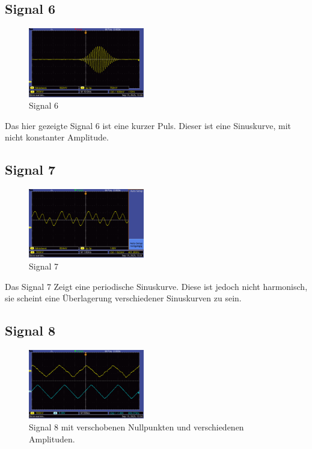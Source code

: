 \newpage
\onecolumn
\twocolumn

\subsection*{Signal 6}
\begin{figure} [h!]
    \centering
        \includegraphics[width=0.45\textwidth]{img/25/Signale2/Signal6.pdf}
    \caption{Signal 6}
\end{figure}

Das hier gezeigte Signal 6 ist eine kurzer Puls. Dieser ist eine Sinuskurve, mit nicht konstanter Amplitude.

\subsection*{Signal 7}
\begin{figure} [h!]
    \centering
        \includegraphics[width=0.45\textwidth]{img/25/Signale2/Signal7.pdf}
    \caption{Signal 7}
\end{figure}

Das Signal 7 Zeigt eine periodische Sinuskurve. Diese ist jedoch nicht harmonisch, sie scheint eine Überlagerung verschiedener Sinuskurven zu sein.

\newpage

\subsection*{Signal 8}
\begin{figure} [h!]
    \centering
        \includegraphics[width=0.45\textwidth]{img/25/Signale2/Signale8-deutlich-getrennt.pdf}
    \caption{Signal 8 mit verschobenen Nullpunkten und verschiedenen Amplituden.}
\end{figure}

